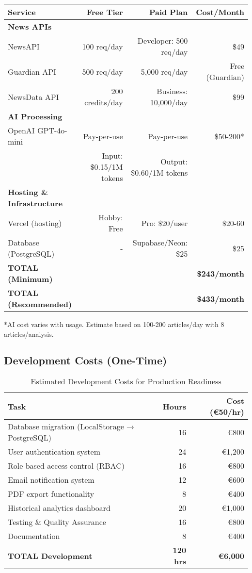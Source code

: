 \documentclass[11pt,a4paper]{article}
\begin{document}
\begin{longtable}{@{}lrrr@{}}
\toprule
\textbf{Service} & \textbf{Free Tier} & \textbf{Paid Plan} & \textbf{Cost/Month} \\ \midrule
\endhead
\textbf{News APIs} & & & \\
NewsAPI & 100 req/day & Developer: 500 req/day & \$49 \\
Guardian API & 500 req/day & 5,000 req/day & Free (Guardian) \\
NewsData API & 200 credits/day & Business: 10,000/day & \$99 \\
\midrule
\textbf{AI Processing} & & & \\
OpenAI GPT-4o-mini & Pay-per-use & Pay-per-use & \$50-200* \\
 & Input: \$0.15/1M tokens & Output: \$0.60/1M tokens & \\
\midrule
\textbf{Hosting \& Infrastructure} & & & \\
Vercel (hosting) & Hobby: Free & Pro: \$20/user & \$20-60 \\
Database (PostgreSQL) & - & Supabase/Neon: \$25 & \$25 \\
\midrule
\textbf{TOTAL (Minimum)} & & & \textbf{\$243/month} \\
\textbf{TOTAL (Recommended)} & & & \textbf{\$433/month} \\
\bottomrule
\end{longtable}

\small{*AI cost varies with usage. Estimate based on 100-200 articles/day with 8 articles/analysis.}

\subsection{Development Costs (One-Time)}

\begin{table}[h]
\centering
\begin{tabular}{@{}lrr@{}}
\toprule
\textbf{Task} & \textbf{Hours} & \textbf{Cost (\euro 50/hr)} \\ \midrule
Database migration (LocalStorage → PostgreSQL) & 16 & \euro 800 \\
User authentication system & 24 & \euro 1,200 \\
Role-based access control (RBAC) & 16 & \euro 800 \\
Email notification system & 12 & \euro 600 \\
PDF export functionality & 8 & \euro 400 \\
Historical analytics dashboard & 20 & \euro 1,000 \\
Testing \& Quality Assurance & 16 & \euro 800 \\
Documentation & 8 & \euro 400 \\
\midrule
\textbf{TOTAL Development} & \textbf{120 hrs} & \textbf{\euro 6,000} \\
\bottomrule
\end{tabular}
\caption{Estimated Development Costs for Production Readiness}
\end{table}
\end{document}
